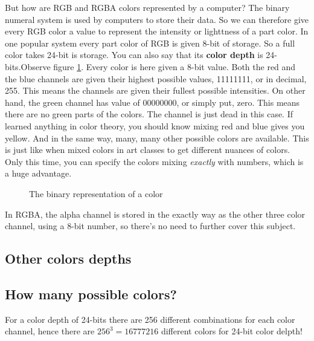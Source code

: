 But how are RGB and RGBA colors represented by a computer? The binary
numeral system is used by computers to store their data. So we can
therefore give every RGB color a value to represent the intensity or
lighttness of a part color. In one popular system every part color of
RGB is given 8-bit of storage. So a full color takes 24-bit is
storage. You can also say that its \textbf{color depth}
 is 24-bits.Observe figure \ref{fig:rgb-bits}. Every color is
here given a 8-bit value. Both the red and the blue channels are given
their highest possible values, 11111111, or in decimal, 255. This
means the channels are given their fullest possible intensities. On
other hand, the green channel has value of 00000000, or simply put,
zero. This means there are no green parts of the colors. The channel
is just dead in this case. If learned anything in color theory, you
should know mixing red and blue gives you yellow. And in the same way,
many, many other possible colors are available. This is just like when
mixed colors in art classes to get different nuances of colors. Only
this time, you can specify the colors mixing \emph{exactly} with
numbers, which is a huge advantage.
\cite{puglia00:_handbook_dig_proj}


\begin{figure}[h]
  \centering
  \newcommand{\bitbox}[3]{
    \filldraw[fill=#2!80!white,draw=black] (#1,0) +(-.2,-.2) rectangle ++(.2,.2);
    \draw (#1,0) node{#3};
  }
  \caption{The binary representation of a color}
  \label{fig:rgb-bits}
\end{figure}


In RGBA, the alpha channel is stored in the exactly way as the other
three color channel, using a 8-bit number, so there's no need to
further cover this subject.

\subsection{Other colors depths}
\label{sec:other-colors-depths}

\subsection{How many possible colors?}
\label{sec:how-many-possible-colors}


For a color depth of 24-bits there are 256 different combinations for
each color channel, hence there are $256^3 = 16777216$ different
colors for 24-bit color delpth! %


\printbibliography
